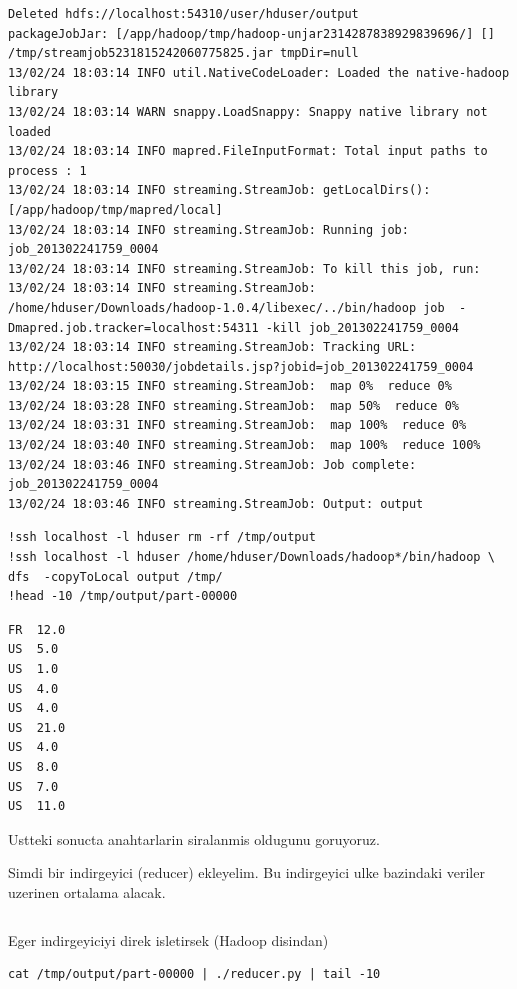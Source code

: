 \documentclass[12pt,fleqn]{article}\usepackage{../common}
\begin{document}
\begin{verbatim}
Deleted hdfs://localhost:54310/user/hduser/output
packageJobJar: [/app/hadoop/tmp/hadoop-unjar2314287838929839696/] [] /tmp/streamjob5231815242060775825.jar tmpDir=null
13/02/24 18:03:14 INFO util.NativeCodeLoader: Loaded the native-hadoop library
13/02/24 18:03:14 WARN snappy.LoadSnappy: Snappy native library not loaded
13/02/24 18:03:14 INFO mapred.FileInputFormat: Total input paths to process : 1
13/02/24 18:03:14 INFO streaming.StreamJob: getLocalDirs(): [/app/hadoop/tmp/mapred/local]
13/02/24 18:03:14 INFO streaming.StreamJob: Running job: job_201302241759_0004
13/02/24 18:03:14 INFO streaming.StreamJob: To kill this job, run:
13/02/24 18:03:14 INFO streaming.StreamJob: /home/hduser/Downloads/hadoop-1.0.4/libexec/../bin/hadoop job  -Dmapred.job.tracker=localhost:54311 -kill job_201302241759_0004
13/02/24 18:03:14 INFO streaming.StreamJob: Tracking URL: http://localhost:50030/jobdetails.jsp?jobid=job_201302241759_0004
13/02/24 18:03:15 INFO streaming.StreamJob:  map 0%  reduce 0%
13/02/24 18:03:28 INFO streaming.StreamJob:  map 50%  reduce 0%
13/02/24 18:03:31 INFO streaming.StreamJob:  map 100%  reduce 0%
13/02/24 18:03:40 INFO streaming.StreamJob:  map 100%  reduce 100%
13/02/24 18:03:46 INFO streaming.StreamJob: Job complete: job_201302241759_0004
13/02/24 18:03:46 INFO streaming.StreamJob: Output: output
\end{verbatim}

\begin{verbatim}
!ssh localhost -l hduser rm -rf /tmp/output
!ssh localhost -l hduser /home/hduser/Downloads/hadoop*/bin/hadoop \
dfs  -copyToLocal output /tmp/
!head -10 /tmp/output/part-00000
\end{verbatim}

\begin{verbatim}
FR	12.0
US	5.0
US	1.0
US	4.0
US	4.0
US	21.0
US	4.0
US	8.0
US	7.0
US	11.0
\end{verbatim}

Ustteki sonucta anahtarlarin siralanmis oldugunu goruyoruz.

Simdi bir indirgeyici (reducer) ekleyelim. Bu indirgeyici ulke bazindaki
veriler uzerinen ortalama alacak. 

\inputminted[fontsize=\footnotesize]{python}{reducer.py}

Eger indirgeyiciyi direk isletirsek (Hadoop disindan)

\begin{verbatim}
cat /tmp/output/part-00000 | ./reducer.py | tail -10
\end{verbatim}
\end{document}
